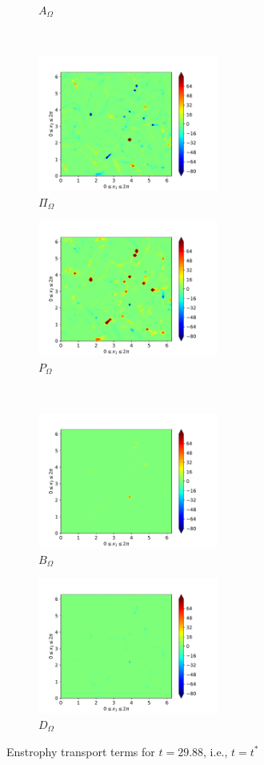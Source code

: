\begin{figure}[H]
\begin{subfigure}{0.45\textwidth}
        \caption{$A_{\Omega}$}
    \end{subfigure}
    ~
    \begin{subfigure}{0.45\textwidth}
        \includegraphics[height=1.75in]{media/run-cds-65/Pi-enst-1340}
        \caption{$\Pi_{\Omega}$}
    \end{subfigure}
    \newline
    \begin{subfigure}{0.45\textwidth}
        \includegraphics[height=1.75in]{media/run-cds-65/P-enst-1340}
        \caption{$P_{\Omega}$}
    \end{subfigure}
    ~
    \begin{subfigure}{0.45\textwidth}
        \includegraphics[height=1.75in]{media/run-cds-65/B-enst-1340}
        \caption{$B_{\Omega}$}
    \end{subfigure}
    \newline
    \begin{subfigure}{0.45\textwidth}
        \includegraphics[height=1.75in]{media/run-cds-65/D-enst-1340}
        \caption{$D_{\Omega}$}
    \end{subfigure}
    \caption{Enstrophy transport terms for $t=29.88$, i.e., $t=t^{\ast} $}
\end{figure}

